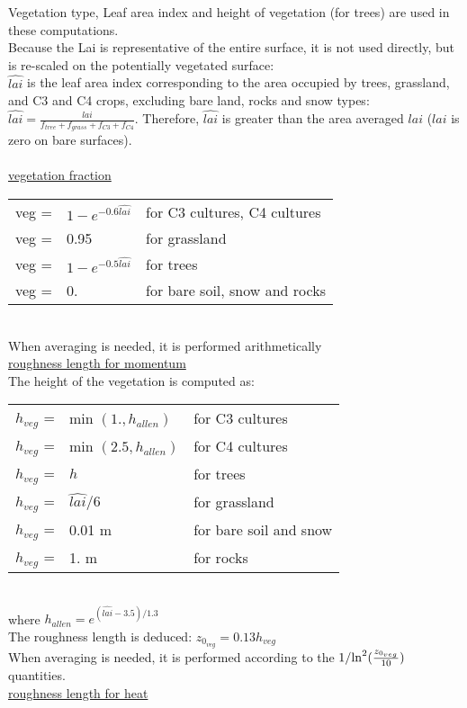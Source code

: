  Vegetation type, Leaf area index and height of vegetation (for trees)
 are used in these computations.\\
 Because the Lai is representative of the entire surface,
 it is not used directly, but is re-scaled on the potentially vegetated surface:\\
 $\hat{lai}$ is the leaf area index corresponding to the area
 occupied by trees, grassland, and C3 and C4 crops,
 excluding bare land, rocks and snow types:
 $\hat{lai} = \frac{lai}{f_{tree}+f_{grass}+f_{C3}+f_{C4}}$.
 Therefore, $\hat{lai}$ is greater than the area averaged $lai$
 ($lai$ is zero on bare surfaces).\\
 \medskip\\
 \underline{ vegetation fraction}\\
 \begin{tabular}{rll}
 veg = & $1-e^{-0.6 \hat{lai}}$ & for C3 cultures, C4 cultures\\
 veg = & 0.95 & for grassland\\
 veg = & $1-e^{-0.5 \hat{lai}}$ & for trees\\
 veg = & 0.   & for bare soil, snow and rocks
 \end{tabular}
 \smallskip\\
 When averaging is needed, it is performed arithmetically
 \medskip\\
 \underline{ roughness length for momentum}\\
 The height of the vegetation is computed as:\\
 \begin{tabular}{rll}
 $h_{veg}$ = & min $(1. , h_{allen})$ & for C3 cultures\\
 $h_{veg}$ = & min $(2.5, h_{allen})$ & for C4 cultures\\
 $h_{veg}$ = & $h$ & for trees\\
 $h_{veg}$ = & $\hat{lai}/6$ & for grassland\\
 $h_{veg}$ = & 0.01 m   & for bare soil and snow\\
 $h_{veg}$ = & 1.   m   & for rocks
 \end{tabular}
\smallskip\\
 where $h_{allen} = e^{(\hat{lai}-3.5)/1.3}$\\
 The roughness length is deduced: $z_{0_{veg}} = 0.13 h_{veg}$\\
 When averaging is needed, it is performed according to the
 $1/{\rm ln}^2(\frac{z_{0_{veg}}}{10})$ quantities.
 \medskip\\
 \underline{ roughness length for heat}\\
